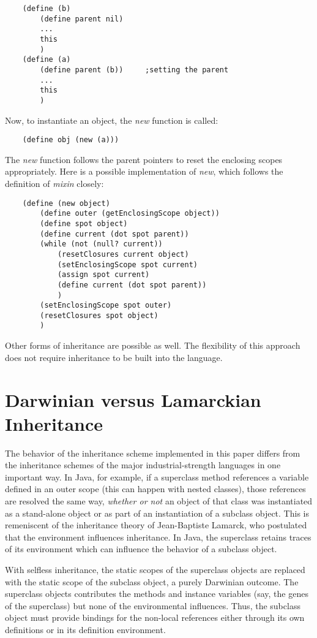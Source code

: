\begin{verbatim}
    (define (b)
        (define parent nil)
        ...
        this
        )
    (define (a)
        (define parent (b))     ;setting the parent 
        ...
        this
        )
\end{verbatim}

Now, to instantiate an object, the {\it new} function is called:

\begin{verbatim}
    (define obj (new (a)))
\end{verbatim}

The {\it new} function follows the parent pointers to reset the enclosing
scopes appropriately. Here is a possible implementation of {\it new},
which follows the definition of {\it mixin} closely:

\begin{verbatim}
    (define (new object)
        (define outer (getEnclosingScope object))
        (define spot object)
        (define current (dot spot parent))
        (while (not (null? current))
            (resetClosures current object)
            (setEnclosingScope spot current)
            (assign spot current)
            (define current (dot spot parent))
            )
        (setEnclosingScope spot outer)
        (resetClosures spot object)
        )
\end{verbatim}

Other forms of inheritance are possible as well. The flexibility of this
approach does not require inheritance to be built into the language.

\section{Darwinian versus Lamarckian Inheritance}

The behavior of the inheritance scheme implemented in this paper differs
from the inheritance schemes of the major industrial-strength languages
in one important way.  In Java, for example, if a superclass method
references a variable defined in an outer scope (this can happen
with nested classes), those references are resolved the same way,
{\it whether or not} an object of that class was instantiated as a
stand-alone object or as part of an instantiation of a subclass object.
This is remeniscent of the inheritance theory of Jean-Baptiste Lamarck,
who postulated that the environment influences inheritance. In Java,
the superclass retains traces of its environment which can influence
the behavior of a subclass object.

With selfless inheritance, the static scopes of the superclass objects
are replaced with the static scope of the subclass object, a purely
Darwinian outcome. The superclass objects contributes the methods
and instance variables (say, the genes of the superclass) but none of
the environmental influences.  Thus, the subclass object must provide
bindings for the non-local references either through its own definitions
or in its definition environment.
